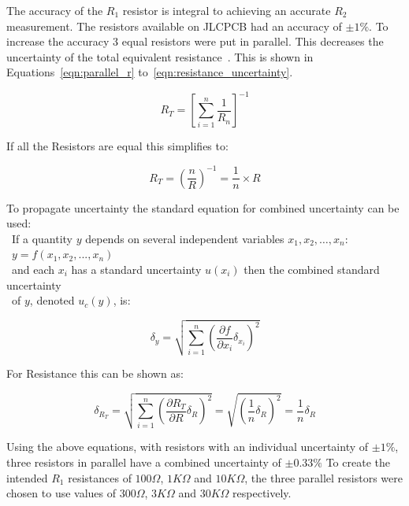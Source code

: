 The accuracy of the $R_1$ resistor is integral to achieving an accurate $R_2$ measurement.
The resistors available on JLCPCB had an accuracy of $\pm{1}\%$.
To increase the accuracy 3 equal resistors were put in parallel. This decreases the uncertainty of the total equivalent resistance~\cite{cam_clark}.
This is shown in Equations~\ref{eqn:parallel_r} to~\ref{eqn:resistance_uncertainty}.

\begin{equation}\label{eqn:parallel_r}
    R_{T} = {\left[{\sum_{i=1}^{n}{\frac{1}{R_n}}}\right]}^{-1}
\end{equation}

If all the Resistors are equal this simplifies to: 

\begin{equation}\label{eqn:parallel_r_equal}
    R_{T} = ({\frac{n}{R}})^{-1} = \frac{1}{n} \times R
\end{equation}

To propagate uncertainty the standard equation for combined uncertainty can be used: \\
\hspace*{2em}~If a quantity $y$ depends on several independent variables $x_1, x_2, \ldots, x_n$: \\
\hspace*{2em}~$y=f(x_1, x_2, ..., x_n)$ \\
\hspace*{2em}~and each $x_i$ has a standard uncertainty $u(x_i)$ then the combined standard uncertainty \\
\hspace*{2em}~of $y$, denoted $u_c(y)$, is:

\begin{equation}\label{eqn:standard_uncertainty}
    \delta_y=\sqrt{\sum_{i=1}^{n}{\left({{\frac{\partial{f}}{\partial{x_i}}}{\delta_{x_i}}}\right)}^2}
\end{equation}

For Resistance this can be shown as:

\begin{equation}\label{eqn:resistance_uncertainty}
    \delta_{R_T}=\sqrt{\sum_{i=1}^{n}{\left({{\frac{\partial{R_{T}}}{\partial{R}}}{\delta_{R}}}\right)}^2} = \sqrt{{\left({{\frac{1}{n}}\delta_R}\right)}^2} = \frac{1}{n}\delta_R
\end{equation}

Using the above equations, with resistors with an individual uncertainty of $\pm1\%$, three resistors in parallel have a combined uncertainty of $\pm0.33\%$
To create the intended $R_1$ resistances of $100\Omega$, $1K\Omega$ and $10K\Omega$, the three parallel resistors were chosen to use values of $300\Omega$, $3K\Omega$ and $30K\Omega$ respectively.

